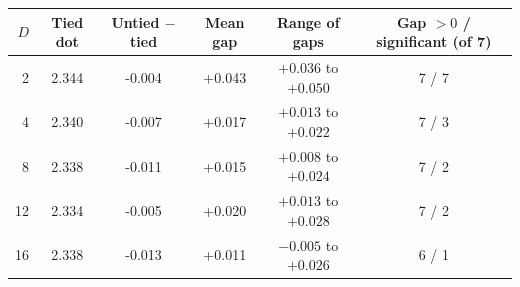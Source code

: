 \begin{tabular}{rccccc}
\toprule
$D$ & Tied dot & Untied $-$ tied & Mean gap & Range of gaps & Gap $>0$ / significant (of 7) \\
\midrule
2 & 2.344 & -0.004 & +0.043 & $+0.036$ to $+0.050$ & 7 / 7 \\
4 & 2.340 & -0.007 & +0.017 & $+0.013$ to $+0.022$ & 7 / 3 \\
8 & 2.338 & -0.011 & +0.015 & $+0.008$ to $+0.024$ & 7 / 2 \\
12 & 2.334 & -0.005 & +0.020 & $+0.013$ to $+0.028$ & 7 / 2 \\
16 & 2.338 & -0.013 & +0.011 & $-0.005$ to $+0.026$ & 6 / 1 \\
\bottomrule
\end{tabular}
